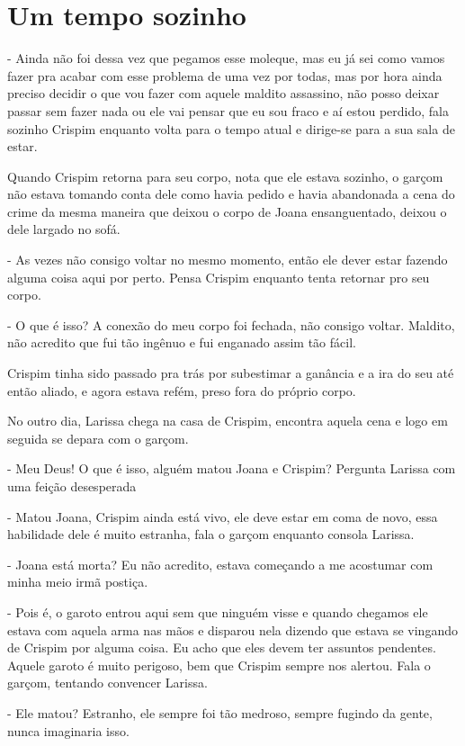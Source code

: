 \chapter{Um tempo sozinho}
- Ainda não foi dessa vez que pegamos esse moleque, mas eu já sei como vamos fazer pra acabar com esse problema de uma vez por todas, mas por hora ainda preciso decidir o que vou fazer com aquele maldito assassino, não posso deixar passar sem fazer nada ou ele vai pensar que eu sou fraco e aí estou perdido, fala sozinho Crispim enquanto volta para o tempo atual e dirige-se para a sua sala de estar.

Quando Crispim retorna para seu corpo, nota que ele estava sozinho, o garçom não estava tomando conta dele como havia pedido e havia abandonada a cena do crime da mesma maneira que deixou o corpo de Joana ensanguentado, deixou o dele largado no sofá. 

- As vezes não consigo voltar no mesmo momento, então ele dever estar fazendo alguma coisa aqui por perto. Pensa Crispim enquanto tenta retornar pro seu corpo.

- O que é isso? A conexão do meu corpo foi fechada, não consigo voltar. Maldito, não acredito que fui tão ingênuo e fui enganado assim tão fácil.

Crispim tinha sido passado pra trás por subestimar a ganância e a ira do seu até então aliado, e agora estava refém, preso fora do próprio corpo.

No outro dia, Larissa chega na casa de Crispim, encontra aquela cena e logo em seguida se depara com o garçom.

- Meu Deus! O que é isso, alguém matou Joana e Crispim? Pergunta Larissa com uma feição desesperada

- Matou Joana, Crispim ainda está vivo, ele deve estar em coma de novo, essa habilidade dele é muito estranha, fala o garçom enquanto consola Larissa.

- Joana está morta? Eu não acredito, estava começando a me acostumar com minha meio irmã postiça.

- Pois é, o garoto entrou aqui sem que ninguém visse e quando chegamos ele estava com aquela arma nas mãos e disparou nela dizendo que estava se vingando de Crispim por alguma coisa. Eu acho que eles devem ter assuntos pendentes. Aquele garoto é muito perigoso, bem que Crispim sempre nos alertou. Fala o garçom, tentando convencer Larissa.

- Ele matou? Estranho, ele sempre foi tão medroso, sempre fugindo da gente, nunca imaginaria isso.

